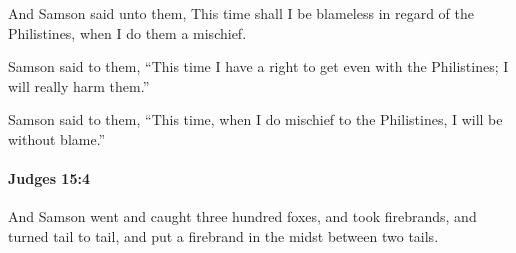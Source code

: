 			\begin{versebox}
					\item[BHS] 
					\item[ASV] And Samson said unto them, This time shall I be blameless in regard of the Philistines, when I do them a mischief.
					\item[NIV] Samson said to them, “This time I have a right to get even with the Philistines; I will really harm them.”
					\item[NRSV] Samson said to them, “This time, when I do mischief to the Philistines, I will be without blame.”
			\end{versebox}

		\paragraph{Judges 15:4} %
			\label{JUDGES-15-4}

			And Samson went and caught three hundred foxes, and took firebrands, and turned tail to tail, and put a firebrand in the midst between two tails.

